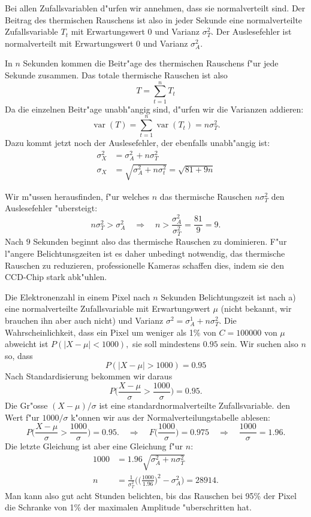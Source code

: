 \begin{loesung}
Bei allen Zufallsvariablen d"urfen wir annehmen, dass sie normalverteilt
sind. Der Beitrag des thermischen Rauschens ist also in jeder Sekunde
eine normalverteilte Zufallsvariable $T_t$ mit Erwartungswert 0
und Varianz $\sigma_T^2$.
Der Auslesefehler ist normalverteilt mit Erwartungswert 0 und
Varianz $\sigma_A^2$.
\begin{teilaufgaben}
\item In $n$ Sekunden kommen die Beitr"age des thermischen Rauschens
f"ur jede Sekunde zusammen. Das totale thermische Rauschen ist
also
\[
T=\sum_{t=1}^n T_t
\]
Da die einzelnen Beitr"age unabh"angig sind, d"urfen wir die Varianzen
addieren:
\[
\operatorname{var}(T)
=\sum_{t=1}^n\operatorname{var}(T_t)=n\sigma_T^2.
\]
Dazu kommt jetzt noch der Auslesefehler, der ebenfalls unabh"angig ist:
\begin{align*}
\sigma_X^2&=\sigma_A^2+n\sigma_T^2\\
\sigma_X&=\sqrt{\sigma_A^2+n\sigma_t^2}=\sqrt{81+9n}
\end{align*}
\item Wir m"ussen herausfinden, f"ur welches $n$ das thermische
Rauschen $n\sigma_T^2$ den Auslesefehler "ubersteigt:
\[
n\sigma_T^2>\sigma_A^2\quad\Rightarrow\quad n>\frac{\sigma_A^2}{\sigma_T^2}=\frac{81}{9}=9.
\]
Nach $9$ Sekunden beginnt also das thermische Rauschen zu dominieren.
F"ur l"angere Belichtunsgzeiten ist es daher unbedingt notwendig,
das thermische Rauschen zu reduzieren, professionelle Kameras
schaffen dies, indem sie den CCD-Chip stark abk"uhlen.
\item
Die Elektronenzahl in einem Pixel nach $n$ Sekunden Belichtungszeit ist
nach a) eine normalverteilte Zufallsvariable mit Erwartungswert
$\mu$ (nicht bekannt, wir brauchen ihn aber auch nicht) und Varianz
$\sigma^2=\sigma_A^1+n\sigma_T^2$. Die Wahrscheinlichkeit, dass ein Pixel
um weniger als 1\% von $C=100000$ von $\mu$ abweicht ist
$
P(|X-\mu| < 1000),
$
sie soll mindestens $0.95$ sein. Wir suchen also $n$ so, dass
\[
P(|X-\mu| > 1000) = 0.95
\]
Nach Standardisierung bekommen wir daraus
\[
P\biggl(\frac{X-\mu}{\sigma}> \frac{1000}{\sigma}\biggr)=0.95.
\]
Die Gr"osse $(X-\mu)/\sigma$ ist eine standardnormalverteilte
Zufallsvariable. den Wert f"ur $1000/\sigma$ k"onnen wir aus
der Normalverteilungstabelle ablesen:
\[
P\biggl(\frac{X-\mu}{\sigma}> \frac{1000}{\sigma}\biggr)=0.95.
\quad
\Rightarrow
\quad
F\biggl(\frac{1000}{\sigma}\biggr)=0.975
\quad
\Rightarrow
\quad
\frac{1000}{\sigma}=1.96.
\]
Die letzte Gleichung ist aber eine Gleichung f"ur $n$:
\begin{align*}
1000&=1.96\sqrt{\sigma_A^2 + n\sigma_T^2}\\
n&=\frac1{\sigma_T^2}\biggl(\biggl(\frac{1000}{1.96}\biggr)^2-\sigma_A^2\biggr)
=28914.
\end{align*}
Man kann also gut acht Stunden belichten, bis das Rauschen bei 95\% der
Pixel die Schranke von 1\% der maximalen Amplitude "uberschritten hat.
\end{teilaufgaben}
\end{loesung}


